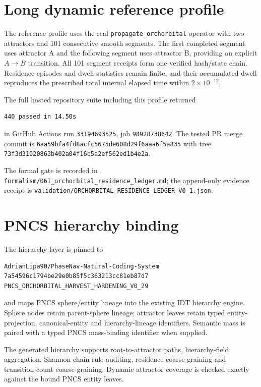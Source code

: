 \section{Long dynamic reference profile}

The reference profile uses the real \texttt{propagate\_orchorbital} operator with two attractors and 101 consecutive smooth segments. The first completed segment uses attractor A and the following segment uses attractor B, providing an explicit \(A\to B\) transition. All 101 segment receipts form one verified hash/state chain. Residence episodes and dwell statistics remain finite, and their accumulated dwell reproduces the prescribed total internal elapsed time within \(2\times10^{-12}\).

The full hosted repository suite including this profile returned
\begin{verbatim}
440 passed in 14.50s
\end{verbatim}
in GitHub Actions run \texttt{33194693525}, job \texttt{98928738642}. The tested PR merge commit is
\texttt{6aa59bfa4fd8acfc5675de608d29f6aaa6f5a835}
with tree
\texttt{73f3d31020863b402a04f16b5a2ef562ed1b4e2a}.

The formal gate is recorded in \texttt{formalism/06I\_orchorbital\_residence\_ledger.md}; the append-only evidence receipt is \texttt{validation/ORCHORBITAL\_RESIDENCE\_LEDGER\_V0\_1.json}.

\section{PNCS hierarchy binding}

The hierarchy layer is pinned to
\begin{verbatim}
AdrianLipa90/PhaseNav-Natural-Coding-System
7a54596c1794be29e0b85f5c363213cc81eb87d7
PNCS_ORCHORBITAL_HARVEST_HARDENING_V0_29
\end{verbatim}
and maps PNCS sphere/entity lineage into the existing IDT hierarchy engine. Sphere nodes retain parent-sphere lineage; attractor leaves retain typed entity-projection, canonical-entity and hierarchy-lineage identifiers. Semantic mass is paired with a typed PNCS mass-binding identifier when supplied.

The generated hierarchy supports root-to-attractor paths, hierarchy-field aggregation, Shannon chain-rule auditing, residence coarse-graining and transition-count coarse-graining. Dynamic attractor coverage is checked exactly against the bound PNCS entity leaves.

